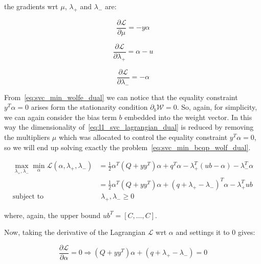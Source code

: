 the gradients wrt $\mu$, $\lambda_+$ and $\lambda_-$ are:

\begin{equation} \label{eq:svc_lagrangian_der_mu}
	\frac{\partial \mathcal{L}}{\partial \mu}=-y \alpha
\end{equation}

\begin{equation} \label{eq:svc_lagrangian_der_lp}
	\frac{\partial \mathcal{L}}{\partial \lambda_+}=\alpha - u
\end{equation}

\begin{equation} \label{eq:svc_lagrangian_der_lm}
    \frac{\partial \mathcal{L}}{\partial \lambda_-}=-\alpha
\end{equation}

From~\eqref{eq:svc_min_wolfe_dual} we can notice that the equality constraint $y^T \alpha = 0$ arises form the stationarity condition $\partial_{{b}} \mathcal{W}=0$. So, again, for simplicity, we can again consider the bias term $b$ embedded into the weight vector. In this way the dimensionality of~\eqref{eq:l1_svc_lagrangian_dual} is reduced by removing the multipliers $\mu$ which was allocated to control the equality constraint $y^T \alpha=0$, so we will end up solving exactly the problem~\eqref{eq:svc_min_bcqp_wolf_dual}.

\begin{equation} \label{eq:l1_svc_bcqp_lagrangian_dual}
	\begin{aligned}
    	\max_{\lambda_+,\lambda_-} \min_{\alpha} \mathcal{L}(\alpha,\lambda_+,\lambda_-) &= \frac{1}{2} \alpha^T (Q + yy^T)\alpha+q^T\alpha - \lambda_+^T (ub - \alpha) - \lambda_-^T \alpha \\
    &= \frac{1}{2} \alpha^T (Q + yy^T)\alpha + (q + \lambda_+ - \lambda_-)^T \alpha - \lambda_+^T ub \\
    \text{subject to} \quad & \,\, \lambda_+, \lambda_- \geq 0
	\end{aligned}
\end{equation}

where, again, the upper bound $ub^T = [C, \dots, C]$.

Now, taking the derivative of the Lagrangian $\mathcal{L}$ wrt $\alpha$ and settings it to 0 gives:

\begin{equation} \label{eq:l1_svc_bcqp_lagrangian_der_a}
	\frac{\partial \mathcal{L}}{\partial \alpha}=0\Rightarrow (Q + yy^T) \alpha + (q + \lambda_+ - \lambda_-) = 0
\end{equation}

